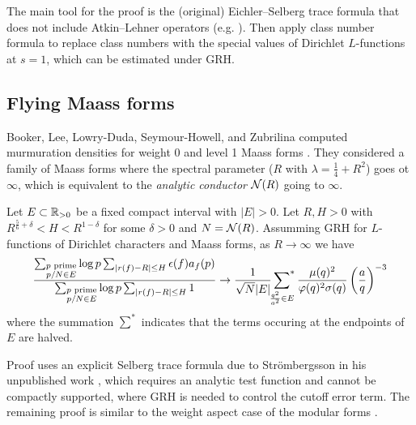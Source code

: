 The main tool for the proof is the (original) Eichler--Selberg trace formula that does not include Atkin--Lehner operators (e.g. \cite[Theorem 2.1]{child2022twist}).
Then apply class number formula to replace class numbers with the special values of Dirichlet $L$-functions at $s = 1$, which can be estimated under GRH.

\subsection{Flying Maass forms}

Booker, Lee, Lowry-Duda, Seymour-Howell, and Zubrilina computed murmuration densities for weight 0 and level 1 Maass forms \cite{booker2024murmurations}.
They considered a family of Maass forms where the spectral parameter ($R$ with $\lambda = \frac{1}{4} + R^2$) goes ot $\infty$, which is equivalent to the \emph{analytic conductor} $\mathcal{N}(R)$ going to $\infty$.

\begin{theorem}
    Let $E \subset \mathbb{R}_{>0}$ be a fixed compact interval with $|E| > 0$.
    Let $R, H > 0$ with $R^{\frac{5}{6} + \delta} < H < R^{1 - \delta}$ for some $\delta > 0$ and $N = \mathcal{N}(R)$.
    Assumming GRH for $L$-functions of Dirichlet characters and Maass forms, as $R \to \infty$ we have 
    \begin{equation}
        \frac{\sum_{\substack{p\text{ prime} \\ p / N \in E}} \log p \sum_{|r(f) - R| \le H} \epsilon(f) a_{f}(p)}{\sum_{\substack{p\text{ prime} \\ p / N \in E}} \log p \sum_{|r(f) - R| \le H} 1} \to \frac{1}{\sqrt{N}|E|}  \sideset{}{^{*}}\sum_{\frac{q^2}{a^2} \in E}  \frac{\mu(q)^2}{\varphi(q)^2 \sigma(q)} \left(\frac{a}{q}\right)^{-3}
    \end{equation}
    where the summation $\sum^{*}$ indicates that the terms occuring at the endpoints of $E$ are halved. 
\end{theorem}

Proof uses an explicit Selberg trace formula due to Str\"ombergsson in his unpublished work \cite{strombergsson}, which requires an analytic test function and cannot be compactly supported, where GRH is needed to control the cutoff error term.
The remaining proof is similar to the weight aspect case of the modular forms \cite{bober2023murmurations}.


